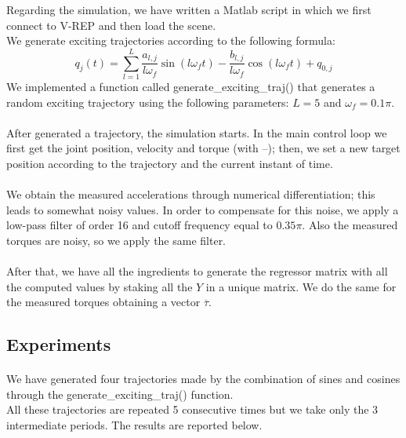 \documentclass{article}
\begin{document}
\FloatBarrier
Regarding the simulation, we have written a Matlab script in which we first connect to V-REP and then load the scene.\\
We generate exciting trajectories according to the following formula:
\[q_j(t) = \sum_{l=1}^{L}{\frac{ a_{l,j}}{ l\omega_f }\sin(l\omega_f t)-\frac{ b_{l,j}}{l\omega_f}\cos(l\omega_f t)+q_{0,j}}\]
We implemented a function called generate\_exciting\_traj() that generates a random exciting trajectory using the following parameters: $L = 5$ and $\omega_f = 0.1\pi$.
\\\\
After generated a trajectory, the simulation starts. In the main control loop we first get the joint position, velocity and torque (with –); then, we set a new target position according to the trajectory and the current instant of time.
\\\\
We obtain the measured accelerations through numerical differentiation; this leads to somewhat noisy values. In order to compensate for this noise, we apply a low-pass filter of order 16 and cutoff frequency equal to $0.35\pi$. Also the measured torques are noisy, so we apply the same filter.
\paragraph{}After that, we have all the ingredients to generate the regressor matrix with all the computed values by staking all the $Y$ in a unique matrix. We do the same for the measured torques obtaining a vector $\overline{\tau}$.

\subsection{Experiments}
\paragraph{}We have generated four trajectories made by the combination of sines and cosines through the generate\_exciting\_traj() function. \\ All these trajectories are repeated 5 consecutive times but we take only the 3 intermediate periods. The results are reported below.
\pagebreak
\end{document}
